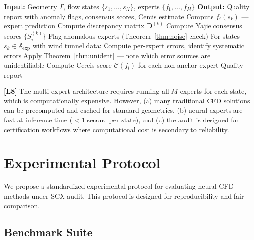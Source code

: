 \documentclass[11pt,a4paper]{article}
\theoremstyle{definition}
\theoremstyle{remark}
\newcommand{\limitationTag}[1]{\textsf{\textbf{[L#1]}}}
\begin{document}
\begin{algorithm}[htbp]
\caption{SCX Audit for a New Aerodynamic Simulation}
\label{alg:scx_cfd}
\begin{algorithmic}[1]
\State \textbf{Input:} Geometry $\Gamma$, flow states $\{s_1, \dots, s_K\}$, experts $\{f_1, \dots, f_M\}$
\State \textbf{Output:} Quality report with anomaly flags, consensus scores, Cercis estimate
        \State Compute $f_i(s_k)$ --- expert prediction
    \EndFor
    \State Compute discrepancy matrix $\mathbf{D}^{(k)}$
    \State Compute Yajie consensus scores $\{S_i^{(k)}\}$
    \State Flag anomalous experts (Theorem~\ref{thm:noise} check)
\EndFor
\State For states $s_k \in \mathcal{S}_{\text{exp}}$ with wind tunnel data:
\State \quad Compute per-expert errors, identify systematic errors
\State \quad Apply Theorem~\ref{thm:unident} --- note which error sources are unidentifiable
\State Compute Cercis score $\mathcal{C}(f_i)$ for each non-anchor expert
\State \Return Quality report
\end{algorithmic}
\end{algorithm}

\limitationTag{8} The multi-expert architecture requires running all $M$ experts for each state, which is computationally expensive. However, (a) many traditional CFD solutions can be precomputed and cached for standard geometries, (b) neural experts are fast at inference time ($< 1$ second per state), and (c) the audit is designed for certification workflows where computational cost is secondary to reliability.

\section{Experimental Protocol}

We propose a standardized experimental protocol for evaluating neural CFD methods under SCX audit.
This protocol is designed for reproducibility and fair comparison.

\subsection{Benchmark Suite}
\end{document}
